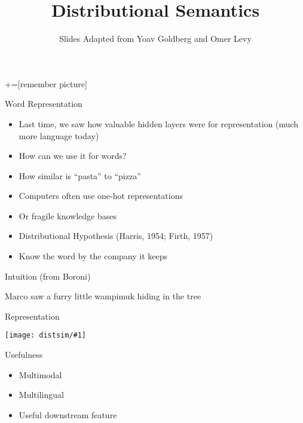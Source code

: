 \documentclass[compress]{beamer}
\title{Distributional Semantics}
\date{Slides Adapted from Yoav Goldberg and Omer Levy}
\newcommand{\gfx}[2]{
\begin{center}
	\texttt{[image: distsim/\#1]}
\end{center}
}
\begin{document}
+=[remember picture]



\begin{frame}
  \titlepage
\end{frame}

\begin{frame}{Word Representation}

\begin{itemize}
  \item Last time, we saw how valuable hidden layers were for
    representation (much more language today)
   \item How can we use it for words?
     \pause
   \item How similar is ``pasta'' to ``pizza''
   \item Computers often use one-hot representations
   \item Or fragile knowledge bases
     \pause
     \item Distributional Hypothesis (Harris, 1954; Firth, 1957)
       \item Know the word by the company it keeps
\end{itemize}

\end{frame}

\begin{frame}{Intuition (from Boroni)}

\begin{block}{}
Marco saw a \alert<3>{furry little} \alert<2>{wampimuk} \alert<3>{hiding in the tree}
\end{block}

\end{frame}

\begin{frame}{Representation}

  \gfx{embedding}{0.8}
\end{frame}

\begin{frame}{Usefulness}

\begin{itemize}
  \item Multimodal
  \item Multilingual
  \item Useful downstream feature
\end{itemize}


\end{frame}
\end{document}
